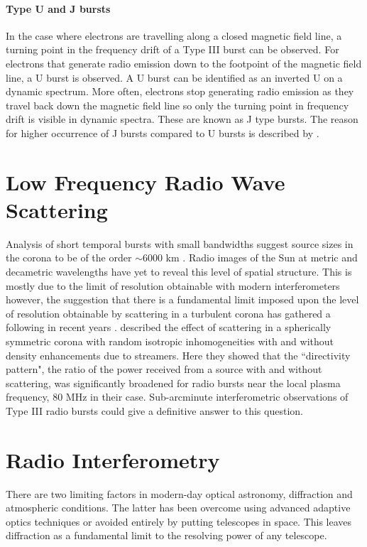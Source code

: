 \paragraph{Type U and J bursts}
In the case where electrons are travelling along a closed magnetic field line, a turning point in the frequency drift of a Type III burst can be observed. For electrons that generate radio emission down to the footpoint of the magnetic field line, a U burst is observed. A U burst can be identified as an inverted U on a dynamic spectrum. More often, electrons stop generating radio emission as they travel back down the magnetic field line so only the turning point in frequency drift is visible in dynamic spectra. These are known as J type bursts. The reason for higher occurrence of J bursts compared to U bursts is described by \cite{Reid2017}.

\section{Low Frequency Radio Wave Scattering}

Analysis of short temporal bursts with small bandwidths suggest source sizes in the corona to be of the order $\sim 6000$ km \citep{McConnell1980}. Radio images of the Sun at metric and decametric wavelengths have yet to reveal this level of spatial structure. This is mostly due to the limit of resolution obtainable with modern interferometers however, the suggestion that there is a fundamental limit imposed upon the level of resolution obtainable by scattering in a turbulent corona \citep{Bastian1994} has gathered a following in recent years \citep{Kontar2017}. \cite{Riddle1974} described the effect of scattering in a spherically symmetric corona with random isotropic inhomogeneities with and without density enhancements due to streamers. Here they showed that the ``directivity pattern", the ratio of the power received from a source with and without scattering, was significantly broadened for radio bursts near the local plasma frequency, 80 MHz in their case.
Sub-arcminute interferometric observations of Type III radio bursts could give a definitive answer to this question.

\section{Radio Interferometry}
There are two limiting factors in modern-day optical astronomy, diffraction and atmospheric conditions. The latter has been overcome using advanced adaptive optics techniques or avoided entirely by putting telescopes in space. This leaves diffraction as a fundamental limit to the resolving power of any telescope.

